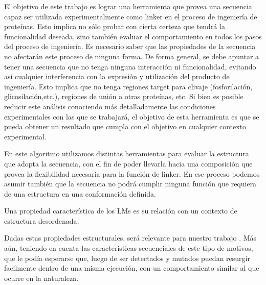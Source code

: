 El objetivo de este trabajo es lograr una herramienta que provea una secuencia capaz ser utilizada experimentalmente como linker en el proceso de ingeniería de proteínas. 
Esto implica no sólo probar con cierta certeza que tendrá la funcionalidad deseada, sino también evaluar el comportamiento en todos los pasos del proceso de ingeniería. 
Es necesario saber que las propiedades de la secuencia no afectarán este proceso de ninguna forma.
De forma general, se debe apuntar a tener una secuencia que no tenga ninguna interacción ni funcionalidad, evitando así cualquier interferencia con la expresión y utilización del producto 
de ingeniería. Esto implica que no tenga regiones target para clivaje (fosforilación, glicosilación,etc.), regiones de unión a otras proteínas, etc.
Si bien es posible reducir este análisis conociendo más detalladamente las condiciones experimentales con las que se trabajará, el objetivo de esta herramienta es que se pueda obtener 
un resultado que cumpla con el objetivo en cualquier contexto experimental. 

En este algoritmo utilizamos distintas herramientas para evaluar la estructura que adopta la secuencia, con el fin de poder llevarla hacia una composición que provea la flexibilidad
necesaria para la función de linker. En ese proceso podemos asumir también que la secuencia no podrá cumplir ninguna función que requiera de una estructura en una conformación definida.


Una propiedad característica de los LMs es su relación con un contexto de estructura desordenada\cite{fuxreiter2007local}.

Dadas estas propiedades estructurales, será relevante para nuestro trabajo . Más aún, teniendo en cuenta las caracteristicas secuenciales de este tipo de motivos, que le 
podía esperarse que, luego de ser detectados y mutados puedan resurgir facilmente dentro de una misma ejecución, con un comportamiento similar al que ocurre en la naturaleza.





